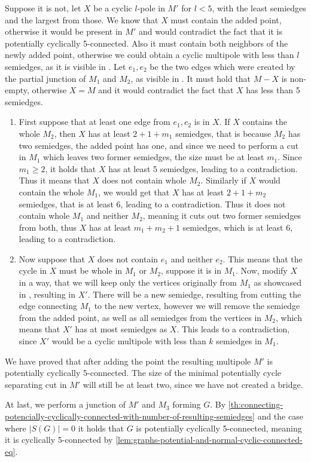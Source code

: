 \documentclass[12pt, twoside]{book}
\begin{document}
\begin{example}
	Suppose it is not, let $X$ be a cyclic $l$-pole in $M'$ for $l<5$, with the least semiedges and the largest from those. We know that $X$ must contain the added point, otherwise it would be present in $M'$ and would contradict the fact that it is potentially cyclically 5-connected. Also it must contain both neighbors of the newly added point, otherwise we could obtain a cyclic multipole with less than $l$ semiedges, as it is visible in . Let $e_1,e_2$ be the two edges which were created by the partial junction of $M_1$ and $M_2$, as visible in .  It must hold that $M-X$ is non-empty, otherwise $X=M$ and it would contradict the fact that $X$ has less than 5 semiedges.
	\begin{enumerate}
		\item First suppose that at least one edge from $e_1,e_2$ is in $X$. If $X$ contains the whole $M_2$, then $X$ has at least $2+1+m_1$ semiedges, that is because $M_2$ has two semiedges, the added point has one, and since we need to perform a cut in $M_1$ which leaves two former semiedges, the size must be at least $m_1$. Since $m_1\geq 2$, it holds that $X$ has at least 5 semiedges, leading to a contradiction. Thus it means that $X$ does not contain whole $M_2$. Similarly if $X$ would contain the whole $M_1$, we would get that $X$ has at least $2+1+m_2$ semiedges, that is at least 6, leading to a contradiction. Thus it does not contain whole $M_1$ and neither $M_2$, meaning it cuts out two former semiedges from both, thus $X$ has at least $m_1+m_2+1$ semiedges, which is at least 6, leading to a contradiction.
		\item Now suppose that $X$ does not contain $e_1$ and neither $e_2$. This means that the cycle in $X$ must be whole in $M_1$ or $M_2$, suppose it is in $M_1$. Now, modify $X$ in a way, that we will keep only the vertices originally from $M_1$ as showcased in , resulting in $X'$. There will be a new semiedge, resulting from cutting the edge connecting $M_1$ to the new vertex, however we will remove the semiedge from the added point, as well as all semiedges from the vertices in $M_2$, which means that $X'$ has at most semiedges as $X$. This leads to a contradiction, since $X'$ would be a cyclic multipole with less than $k$ semiedges in $M_1$.
	\end{enumerate}

	We have proved that after adding the point the resulting multipole $M'$ is potentially cyclically 5-connected. The size of the minimal potentially cycle separating cut in $M'$ will still be at least two, since we have not created a bridge.
	
	At last, we perform a junction of $M'$ and $M_3$ forming $G$. By \cref{th:connecting-potencially-cyclically-connected-with-number-of-resulting-semiedges} and the case where $|S(G)|=0$ it holds that $G$ is potentially cyclically 5-connected, meaning it is cyclically 5-connected by \cref{lem:graphs-potential-and-normal-cyclic-connected-eq}.
	
\end{example}
\end{document}
